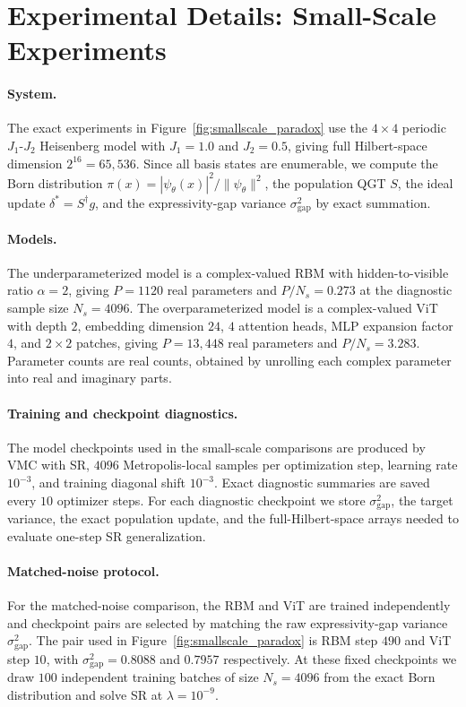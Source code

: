 \section{Experimental Details: Small-Scale Experiments}\label{app:small}

\paragraph{System.}
The exact experiments in Figure~\ref{fig:smallscale_paradox} use the $4\times4$
periodic $J_1$-$J_2$ Heisenberg model with $J_1=1.0$ and $J_2=0.5$, giving full
Hilbert-space dimension $2^{16}=65{,}536$. Since all basis states are enumerable,
we compute the Born distribution $\pi(x)=|\psi_\theta(x)|^2/\|\psi_\theta\|^2$,
the population QGT $S$, the ideal update $\delta^*=S^\dagger g$, and the
expressivity-gap variance $\sigma_{\mathrm{gap}}^2$ by exact summation.

\paragraph{Models.}
The underparameterized model is a complex-valued RBM with hidden-to-visible ratio
$\alpha=2$, giving $P=1120$ real parameters and $P/N_s=0.273$ at the diagnostic
sample size $N_s=4096$. The overparameterized model is a complex-valued ViT with
depth $2$, embedding dimension $24$, $4$ attention heads, MLP expansion factor
$4$, and $2\times2$ patches, giving $P=13{,}448$ real parameters and
$P/N_s=3.283$. Parameter counts are real counts, obtained by unrolling each
complex parameter into real and imaginary parts.

\paragraph{Training and checkpoint diagnostics.}
The model checkpoints used in the small-scale comparisons are produced by VMC
with SR, $4096$ Metropolis-local samples per optimization step, learning rate
$10^{-3}$, and training diagonal shift $10^{-3}$. Exact diagnostic summaries are
saved every $10$ optimizer steps. For each diagnostic checkpoint we store
$\sigma_{\mathrm{gap}}^2$, the target variance, the exact population update, and
the full-Hilbert-space arrays needed to evaluate one-step SR generalization.

\paragraph{Matched-noise protocol.}
For the matched-noise comparison, the RBM and ViT are trained independently and
checkpoint pairs are selected by matching the raw expressivity-gap variance
$\sigma_{\mathrm{gap}}^2$. The pair used in Figure~\ref{fig:smallscale_paradox}
is RBM step $490$ and ViT step $10$, with
$\sigma_{\mathrm{gap}}^2=0.8088$ and $0.7957$ respectively. At these fixed
checkpoints we draw $100$ independent training batches of size $N_s=4096$ from
the exact Born distribution and solve SR at $\lambda=10^{-9}$.

